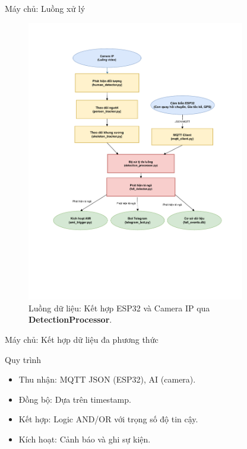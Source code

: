 \begin{frame}[fragile]{Máy chủ: Luồng xử lý}
    \begin{figure}
        \centering
        \includegraphics[width=0.85\textwidth,height=0.7\textheight,keepaspectratio]{images/server_flow.pdf}
        \caption{Luồng dữ liệu: Kết hợp ESP32 và Camera IP qua \textbf{DetectionProcessor}.}
        \label{fig:server_flow}
    \end{figure}
\end{frame}

\begin{frame}{Máy chủ: Kết hợp dữ liệu đa phương thức}
    \begin{block}{Quy trình}
        \begin{itemize}
            \item Thu nhận: MQTT JSON (ESP32), AI (camera).
            \item Đồng bộ: Dựa trên timestamp.
            \item Kết hợp: Logic AND/OR với trọng số độ tin cậy.
            \item Kích hoạt: Cảnh báo và ghi sự kiện.
        \end{itemize}
    \end{block}
    \label{subsubsec:multi_input_fusion}
\end{frame}

